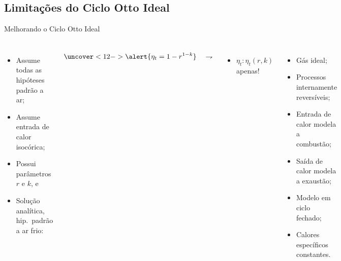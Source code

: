 \subsection{Limitações do Ciclo Otto Ideal}

    \begin{frame}{Melhorando o Ciclo Otto Ideal}\vspace*{-2em}
        \begin{columns}
        \begin{itemize}
            \item<2->  Assume todas as \alert{hipóteses padrão a ar};
            \item<8->  Assume entrada de calor \alert{isocórica};
            \item<9->  Possui parâmetros \alert{$r$} e \alert{$k$}, e
            \item<10-> Solução analítica, \alert{hip.~padrão a ar frio}:\\[\bigskipamount]
        \end{itemize}
        \begin{equation*}
            \uncover<12->{\alert{\eta_t = 1 - r^{1-k}}\quad\rightharpoondown}
        \end{equation*}%
        \vspace*{-1em}
        \begin{itemize}
            \item<13-> $\eta_t\!:\!\eta_t(r, k)$ \alert{apenas}!
        \end{itemize}
        \begin{itemize}
            \item<3->  Gás \alert{ideal};
            \item<4->  Processos \alert{internamente reversíveis};
            \item<5->  Entrada de \alert{calor} modela a combustão;
            \item<6->  Saída de \alert{calor} modela a exaustão;
            \item<7->  Modelo em \alert{ciclo fechado};
            \item<11-> Calores específicos \alert{constantes}.
        \end{itemize}
        \end{columns}
    \end{frame}

